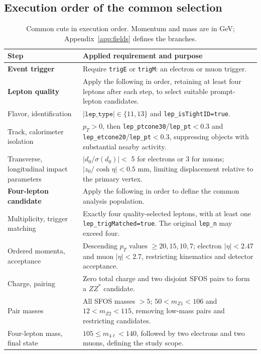 \documentclass[11pt,a4paper]{article}
\begin{document}
\subsection{Execution order of the common selection}
\begin{table}[H]
\caption{Common cuts in execution order. Momentum and mass are in GeV; Appendix~\ref{app:fields} defines the branches.}
\label{tab:cuts}
\small
\renewcommand{\arraystretch}{1.1}
\begin{tabularx}{\linewidth}{@{}>{\raggedright\arraybackslash}p{.23\linewidth}Y@{}}
\toprule
Step & Applied requirement and purpose \\
\midrule
\textbf{Event trigger} & Require \texttt{trigE} or \texttt{trigM}: an electron or muon trigger. \\
\midrule
\textbf{Lepton quality} & Apply the following in order, retaining at least four leptons after each step, to select suitable prompt-lepton candidates. \\
Flavor, identification & $|\texttt{lep\_type}|\in\{11,13\}$ and \texttt{lep\_isTightID=true}. \\
Track, calorimeter isolation & $p_T>0$, then \texttt{lep\_ptcone30}/\texttt{lep\_pt}$<0.3$ and \texttt{lep\_etcone20}/\texttt{lep\_pt}$<0.3$, suppressing objects with substantial nearby activity. \\
Transverse, longitudinal impact parameters & $|d_0/\sigma(d_0)|<$ 5 for electrons or 3 for muons; $|z_0/\cosh\eta|<0.5$ mm, limiting displacement relative to the primary vertex. \\
\midrule
\textbf{Four-lepton candidate} & Apply the following in order to define the common analysis population. \\
Multiplicity, trigger matching & Exactly four quality-selected leptons, with at least one \texttt{lep\_trigMatched=true}. The original \texttt{lep\_n} may exceed four. \\
Ordered momenta, acceptance & Descending $p_T$ values $\geq20,15,10,7$; electron $|\eta|<2.47$ and muon $|\eta|<2.7$, restricting kinematics and detector acceptance. \\
Charge, pairing & Zero total charge and two disjoint SFOS pairs to form a $ZZ^*$ candidate. \\
Pair masses & All SFOS masses $>5$; $50<m_{Z1}<106$ and $12<m_{Z2}<115$, removing low-mass pairs and restricting candidates. \\
Four-lepton mass, final state & $105\leq m_{4\ell}<140$, followed by two electrons and two muons, defining the study scope. \\
\bottomrule
\end{tabularx}
\end{table}
\end{document}
